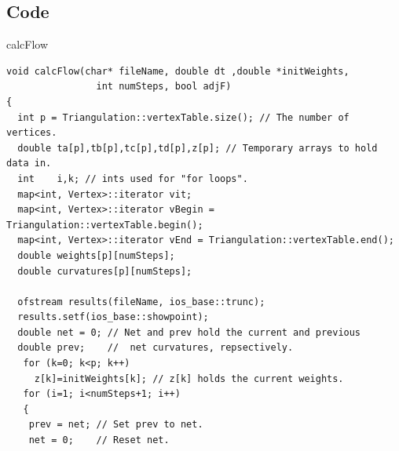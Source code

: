 \documentclass[12pt]{article}
\begin{document}
\newpage
\subsection{Code}
\label{calcFlowCode}
\noindent calcFlow
\begin{verbatim}
void calcFlow(char* fileName, double dt ,double *initWeights,
				int numSteps, bool adjF)  
{
  int p = Triangulation::vertexTable.size(); // The number of vertices.
  double ta[p],tb[p],tc[p],td[p],z[p]; // Temporary arrays to hold data in.
  int    i,k; // ints used for "for loops".
  map<int, Vertex>::iterator vit;
  map<int, Vertex>::iterator vBegin = Triangulation::vertexTable.begin();
  map<int, Vertex>::iterator vEnd = Triangulation::vertexTable.end();
  double weights[p][numSteps];
  double curvatures[p][numSteps];
  
  ofstream results(fileName, ios_base::trunc);
  results.setf(ios_base::showpoint);
  double net = 0; // Net and prev hold the current and previous
  double prev;    //  net curvatures, repsectively.
   for (k=0; k<p; k++)
     z[k]=initWeights[k]; // z[k] holds the current weights.
   for (i=1; i<numSteps+1; i++) 
   {
    prev = net; // Set prev to net.
    net = 0;    // Reset net.
    

\end{verbatim}
\end{document}
